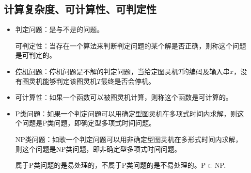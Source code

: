 \subsection{计算复杂度、可计算性、可判定性}
\begin{itemize}
    \item 判定问题：是与不是的问题。

    可判定性：当存在一个算法来判断判定问题的某个解是否正确，则称这个问题是可判定的。

    \item \uline{停机问题}：停机问题是不解的判定问题，当给定图灵机$T$的编码及输入串$x$，没有图灵机能够判定该图灵机$T$最终是否会停机。

    \item 可计算性：如果一个函数可以被图灵机计算，则称这个函数是可计算的。

    \item P类问题：如果一个判定问题可以用确定型图灵机在多项式时间内求解，则这个问题是P类问题，即确定型多项式时间问题。

    NP类问题：如歌一个判定问题可以用非确定型图灵机在多形式时间内求解，则这个问题是NP类问题，即非确定型多项式时间问题。

    属于P类问题的是易处理的，不属于P类问题的是不易处理的。P$\subset$NP.
\end{itemize}